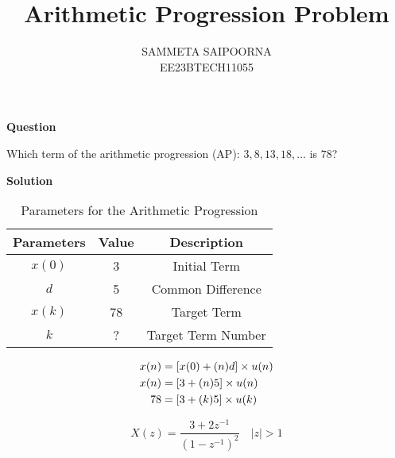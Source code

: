 \documentclass[12pt]{article}
\title{Arithmetic Progression Problem}
\author{SAMMETA SAIPOORNA \\
        EE23BTECH11055}
\date{}
\newcommand{\initialterm}{3}
\newcommand{\commondifference}{5}
\begin{document}
\maketitle

\textbf{Question}

Which term of the arithmetic progression (AP): \(3, 8, 13, 18, \ldots\) is \(78\)?

\textbf{Solution}
\begin{table}[h!]
\centering

\begin{tabular}{|c|c|c|}
  \hline
  Parameters & Value & Description \\
  \hline
  \(x(0)\) & 3 & Initial Term \\
  \hline
  \(d\) & 5 & Common Difference \\
  \hline
  \(x(k)\) & 78 & Target Term \\
  \hline
  \(k\) & ? & Target Term Number\\
  \hline
\end{tabular}
\caption{Parameters for the Arithmetic Progression}
\label{tab:ap-parameters}
\end{table}
\begin{align}
x(n) &= [x(0) + (n)d] \times u(n) \notag\\
x(n) &= [\initialterm + (n)\commondifference] \times u(n) \notag\\
78 &= [\initialterm + (k)\commondifference] \times u(k) \notag
\end{align}

\[ X(z) = \frac{3 + 2z^{-1}}{(1 - z^{-1})^2} \quad |z| > 1 \]
\end{document}
